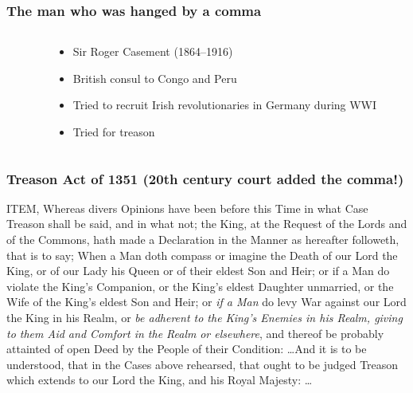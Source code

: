 
\begin{frame}
  \frametitle{The man who was hanged by a comma}

\begin{columns}
\begin{column}{3cm}
\end{column}
\begin{column}{7cm}
\begin{itemize}
\item Sir Roger Casement (1864--1916)
\item British consul to Congo and Peru
\item Tried to recruit Irish revolutionaries in Germany during WWI
\item Tried for treason
\end{itemize}
\end{column}
\end{columns}

\end{frame}

\begin{frame}
  \frametitle{Treason Act of 1351 (20th century court added the comma!)}

\small
ITEM, Whereas divers Opinions have been before this Time in what Case
Treason shall be said, and in what not; the King, at the Request of
the Lords and of the Commons, hath made a Declaration in the Manner as
hereafter followeth, that is to say; When a Man doth compass or
imagine the Death of our Lord the King, or of our Lady his Queen or of
their eldest Son and Heir; or if a Man do violate the King's
Companion, or the King's eldest Daughter unmarried, or the Wife of the
King's eldest Son and Heir; or \emph{if a Man} do levy War against our Lord
the King in his Realm, or \emph{be adherent to the King's Enemies in his
Realm, giving to them Aid and Comfort in the Realm} \emph{or elsewhere}, and
thereof be probably attainted of open Deed by the People of their
Condition: \dots And it is to be
understood, that in the Cases above rehearsed, that ought to be judged
Treason which extends to our Lord the King, and his Royal Majesty:
\dots

\end{frame}

